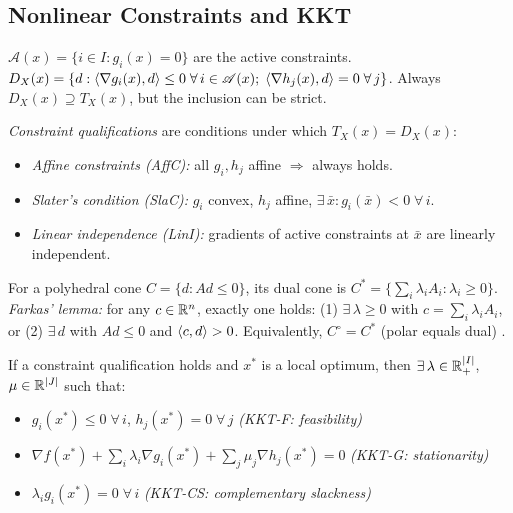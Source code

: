 \subsection{Nonlinear Constraints and KKT}\label{sec:kkt}

\begin{definition}\label{def:active-dx}
	$\mathcal{A}(x) = \{i \in I : g_i(x) = 0\}$ are the active constraints.
	$D_X(x) = \{d : \langle\nabla g_i(x), d\rangle \leq 0\;\forall\, i \in \mathcal{A}(x);\; \langle\nabla h_j(x), d\rangle = 0\;\forall\, j\}$.
	Always $D_X(x) \supseteq T_X(x)$, but the inclusion can be strict.
\end{definition}

\emph{Constraint qualifications} are conditions under which $T_X(x) = D_X(x)$:
\begin{itemize}
	\item \textit{Affine constraints (AffC):} all $g_i, h_j$ affine $\Rightarrow$ always holds.
	\item \textit{Slater's condition (SlaC):} $g_i$ convex, $h_j$ affine, $\exists\, \bar{x} : g_i(\bar{x}) < 0\;\forall\, i$.
	\item \textit{Linear independence (LinI):} gradients of active constraints at $\bar{x}$ are linearly independent.
\end{itemize}

\begin{definition}\label{def:farkas}
	For a polyhedral cone $C = \{d : Ad \leq 0\}$, its dual cone is $C^* = \{\sum_i \lambda_i A_i : \lambda_i \geq 0\}$.
	\textit{Farkas' lemma:} for any $c \in \mathbb{R}^n$, exactly one holds: (1) $\exists\, \lambda \geq 0$ with $c = \sum_i \lambda_i A_i$, or (2) $\exists\, d$ with $Ad \leq 0$ and $\langle c, d\rangle > 0$.
	Equivalently, $C^\circ = C^*$ (polar equals dual) \cite{bazaraa2006}.
\end{definition}

\begin{theorem}\label{thm:kkt}
	If a constraint qualification holds and $x^*$ is a local optimum, then $\exists\, \lambda \in \mathbb{R}_+^{|I|}$, $\mu \in \mathbb{R}^{|J|}$ such that:
	\begin{itemize}
		\item $g_i(x^*) \leq 0\;\forall\, i$, $h_j(x^*) = 0\;\forall\, j$ \hfill\textit{(KKT-F: feasibility)}
		\item $\nabla f(x^*) + \sum_i \lambda_i \nabla g_i(x^*) + \sum_j \mu_j \nabla h_j(x^*) = 0$ \hfill\textit{(KKT-G: stationarity)}
		\item $\lambda_i g_i(x^*) = 0\;\forall\, i$ \hfill\textit{(KKT-CS: complementary slackness)}
	\end{itemize}
\end{theorem}

